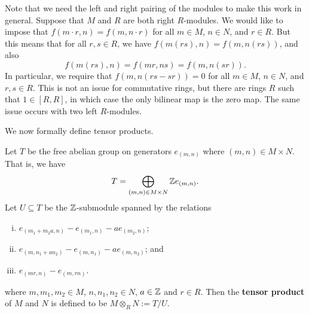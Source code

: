 \begin{remark}{}
    Note that we need the left and right pairing of the modules to make this work 
    in general. Suppose that $M$ and $R$ are both right $R$-modules. We would like 
    to impose that $f(m \cdot r, n) = f(m, n \cdot r)$ for all $m \in M$, $n \in N$, and 
    $r \in R$. But this means that for all $r, s \in R$, we have $f(m(rs), n) 
    = f(m, n(rs))$, and also 
    \[ f(m(rs), n) = f(mr, ns) = f(m, n(sr)). \] 
    In particular, we require that $f(m, n(rs - sr)) = 0$ for all $m \in M$, 
    $n \in N$, and $r, s \in R$. This is not an issue for commutative rings, 
    but there are rings $R$ such that $1 \in [R, R]$, in which case the only 
    bilinear map is the zero map. The same issue occurs with two left $R$-modules. 
\end{remark}

We now formally define tensor products. 

\begin{defn}{}
    Let $T$ be the free abelian group on generators $e_{(m,n)}$ where $(m, n) 
    \in M \times N$. That is, we have 
    \[ T = \bigoplus_{(m, n) \in M \times N} \mathbb{Z} e_{(m,n)}. \] 
    Let $U \subseteq T$ be the $\mathbb{Z}$-submodule spanned by the relations 
    \begin{enumerate}[(i)]
        \item $e_{(m_1 + m_2a, n)} - e_{(m_1, n)} - ae_{(m_2, n)}$; 
        \item $e_{(m, n_1 + an_2)} - e_{(m, n_1)} - ae_{(m, n_2)}$; and 
        \item $e_{(mr, n)} - e_{(m, rn)}$. 
    \end{enumerate}
    where $m, m_1, m_2 \in M$, $n, n_1, n_2 \in N$, $a \in \mathbb{Z}$ and $r \in R$. 
    Then the {\bf tensor product} of $M$ and $N$ is defined to be 
    $M \otimes_R N := T/U$. 
\end{defn}
